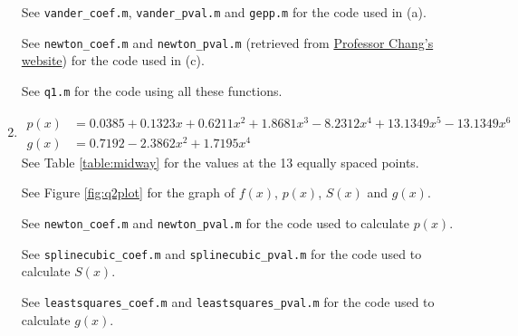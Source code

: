 \documentclass{article}
\begin{document}
\begin{enumerate}
See \texttt{vander\_coef.m}, \texttt{vander\_pval.m} and \texttt{gepp.m} for the code used in (a).

See \texttt{newton\_coef.m} and \texttt{newton\_pval.m} (retrieved from \href{http://cs.mcgill.ca/~chang/teaching/cs350/doc.php}{Professor Chang's website}) for the code used in (c).

See \texttt{q1.m} for the code using all these functions.

\item \begin{align*}
p(x) &= 0.0385 + 0.1323x + 0.6211x^2 + 1.8681x^3 - 8.2312x^4 + 13.1349x^5 - 13.1349x^6 \\
g(x) &= 0.7192 - 2.3862x^2 + 1.7195x^4
\end{align*}
See Table \ref{table:midway} for the values at the 13 equally spaced points.

See Figure \ref{fig:q2plot} for the graph of $f(x)$, $p(x)$, $S(x)$ and $g(x)$.

See \texttt{newton\_coef.m} and \texttt{newton\_pval.m} for the code used to calculate $p(x)$.

See \texttt{splinecubic\_coef.m} and \texttt{splinecubic\_pval.m} for the code used to calculate $S(x)$.

See \texttt{leastsquares\_coef.m} and \texttt{leastsquares\_pval.m} for the code used to calculate $g(x)$.


\end{enumerate}
\end{document}
